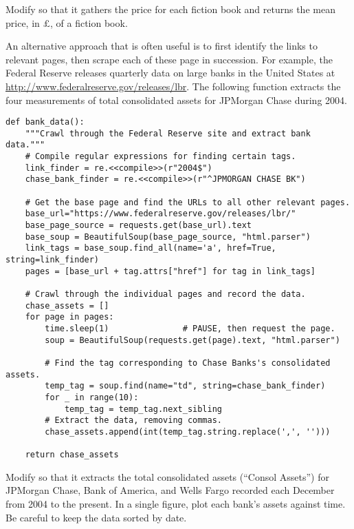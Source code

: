 \begin{problem} %
Modify  so that it gathers the price for each fiction book and returns the mean price, in $\pounds$, of a fiction book.

\end{problem}

An alternative approach that is often useful is to first identify the links to relevant pages, then scrape each of these page in succession.
For example, the Federal Reserve releases quarterly data on large banks in the United States at \url{http://www.federalreserve.gov/releases/lbr}.
The following function extracts the four measurements of total consolidated assets for JPMorgan Chase during 2004.

\begin{lstlisting}
def bank_data():
    """Crawl through the Federal Reserve site and extract bank data."""
    # Compile regular expressions for finding certain tags.
    link_finder = re.<<compile>>(r"2004$")
    chase_bank_finder = re.<<compile>>(r"^JPMORGAN CHASE BK")

    # Get the base page and find the URLs to all other relevant pages.
    base_url="https://www.federalreserve.gov/releases/lbr/"
    base_page_source = requests.get(base_url).text
    base_soup = BeautifulSoup(base_page_source, "html.parser")
    link_tags = base_soup.find_all(name='a', href=True, string=link_finder)
    pages = [base_url + tag.attrs["href"] for tag in link_tags]

    # Crawl through the individual pages and record the data.
    chase_assets = []
    for page in pages:
        time.sleep(1)               # PAUSE, then request the page.
        soup = BeautifulSoup(requests.get(page).text, "html.parser")

        # Find the tag corresponding to Chase Banks's consolidated assets.
        temp_tag = soup.find(name="td", string=chase_bank_finder)
        for _ in range(10):
            temp_tag = temp_tag.next_sibling
        # Extract the data, removing commas.
        chase_assets.append(int(temp_tag.string.replace(',', '')))

    return chase_assets
\end{lstlisting}


\begin{problem} %
Modify  so that it extracts the total consolidated assets (``Consol Assets'') for JPMorgan Chase, Bank of America, and Wells Fargo recorded each December from 2004 to the present.
In a single figure, plot each bank's assets against time.
Be careful to keep the data sorted by date.
\end{problem}

